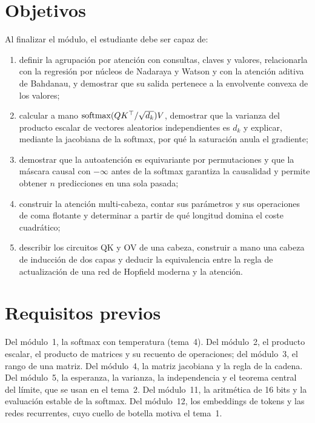 \documentclass[11pt,a4paper,twoside,openany]{book}
\newcommand{\T}{^{\top}}
\begin{document}
\section*{Objetivos}
Al finalizar el módulo, el estudiante debe ser capaz de:
\begin{enumerate}[label=\arabic*.]
  \item definir la agrupación por atención con consultas, claves y valores, relacionarla con la regresión por núcleos de Nadaraya y Watson y con la atención aditiva de Bahdanau, y demostrar que su salida pertenece a la envolvente convexa de los valores;
  \item calcular a mano $\softmax(QK\T/\sqrt{d_k})V$, demostrar que la varianza del producto escalar de vectores aleatorios independientes es $d_k$ y explicar, mediante la jacobiana de la softmax, por qué la saturación anula el gradiente;
  \item demostrar que la autoatención es equivariante por permutaciones y que la máscara causal con $-\infty$ antes de la softmax garantiza la causalidad y permite obtener $n$ predicciones en una sola pasada;
  \item construir la atención multi-cabeza, contar sus parámetros y sus operaciones de coma flotante y determinar a partir de qué longitud domina el coste cuadrático;
  \item describir los circuitos QK y OV de una cabeza, construir a mano una cabeza de inducción de dos capas y deducir la equivalencia entre la regla de actualización de una red de Hopfield moderna y la atención.
\end{enumerate}

\section*{Requisitos previos}
Del módulo~1, la softmax con temperatura (tema~4). Del módulo~2, el producto escalar, el producto de matrices y su recuento de operaciones; del módulo~3, el rango de una matriz. Del módulo~4, la matriz jacobiana y la regla de la cadena. Del módulo~5, la esperanza, la varianza, la independencia y el teorema central del límite, que se usan en el tema~2. Del módulo~11, la aritmética de 16 bits y la evaluación estable de la softmax. Del módulo~12, los embeddings de tokens y las redes recurrentes, cuyo cuello de botella motiva el tema~1.
\end{document}
